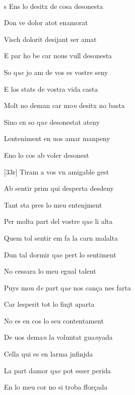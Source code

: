 \documentclass[12pt]{article}
\renewcommand{\espaiAbansEtiquetaPoema}{\vspace{0ex}}
\begin{document}
\begin{estrofa}

\espaiAbansEtiquetaPoema

\\

\end{estrofa}


\begin{estrofa}

 s Ens lo desitx de cosa desonesta

 Don ve dolor atot enamorat

 Visch dolorit desijant ser amat

 E par ho be car nous vull desonesta

 So q\textit{ue} jo am de vos es vostre seny

 E los stats de vostra vida casta

 Molt no deman car mo\textit{n} desitx no basta

 Sino en so q\textit{ue }desonestat ateny

\end{estrofa}



\begin{estrofa}

 Lenteniment en uos amar manpeny

 Eno lo cos ab voler desonest

 [33r] Tiram a vos vn amigable gest

 Ab sentir prim qui desperta desdeny

 Tant sta pres lo meu entenjment

 Per molta part del vostre q\textit{ue} li alta

 Quem tol sentir em fa la carn malalta

 Dun tal dormir q\textit{ue} pert lo sentiment

\end{estrofa}



\begin{estrofa}

 No cessara lo meu egual talent

 Puys mou d\textit{e} part q\textit{ue} nos can\c{c}a nes farta

 Car lesperit tot lo finjt aparta

 No es en cos lo seu contentament

 De uos dema\textit{n} la voluntat gua\textit{n}yada

 Cella qui es en larma jnfinjda

 La part damor q\textit{ue} pot esser perida

 En lo meu cor no si troba ffor\c{c}ada

\end{estrofa}
\end{document}
